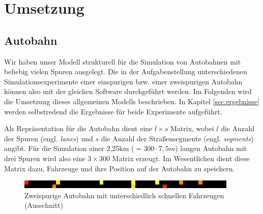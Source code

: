 \documentclass[10pt, a4paper]{article}
\begin{document}

\section{Umsetzung}
\label{sec:umsetzung}

\subsection{Autobahn}
\label{subsec:umsetzung-autobahn}

Wir haben unser Modell strukturell für die Simulation von Autobahnen mit beliebig vielen Spuren ausgelegt. Die in der Aufgabenstellung unterschiedenen Simulationsexperimente einer einspurigen bzw. einer zweispurigen Autobahn können also mit der gleichen Software durchgeführt werden. Im Folgenden wird die Umsetzung dieses allgemeinen Modells beschrieben. In Kapitel \ref{sec:ergebnisse} werden selbstredend die Ergebnisse für beide Experimente aufgeführt.

Als Repräsentation für die Autobahn dient eine $l \times s$ Matrix, wobei $l$ die Anzahl der Spuren (engl. \emph{lanes}) und $s$ die Anzahl der Straßensegmente (engl. \emph{segments}) angibt. Für die Simulation einer 2,25km ($= 300 \cdot 7,5m$) langen Autobahn mit drei Spuren wird also eine $3 \times 300$ Matrix erzeugt. Im Wesentlichen dient diese Matrix dazu, Fahrzeuge und ihre Position auf der Autobahn zu speichern.\\

\begin{figure}[h!]
	\centering
	\includegraphics{img/twoLaneRoad}
	\caption{Zweispurige Autobahn mit unterschiedlich schnellen Fahrzeugen (Ausschnitt)}
	\label{fig:twoLaneRoad}
\end{figure}
\end{document}
